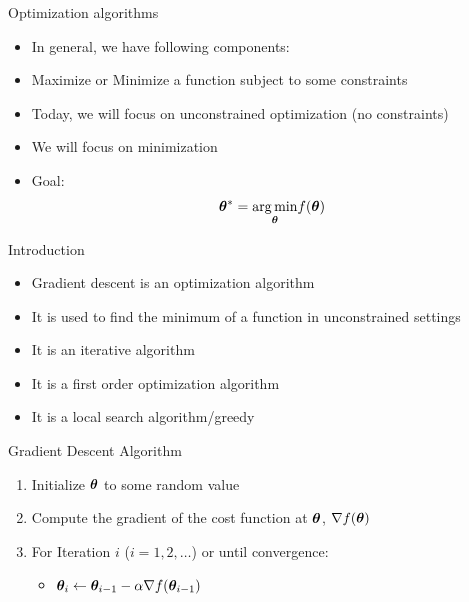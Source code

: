\documentclass[usenames,dvipsnames]{beamer}
\begin{document}
  \begin{frame}{Optimization algorithms}
    \begin{itemize}[<+->]
        \item In general, we have following components:
        \item Maximize or Minimize a function subject to some constraints
        \item Today, we will focus on unconstrained optimization (no constraints)
        \item We will focus on minimization
        \item Goal: 
        \begin{equation}
            \boldsymbol{\theta}^* = \underset{\boldsymbol{\theta}}{\operatorname*{arg\,min}}  f(\boldsymbol{\theta})
        \end{equation}
    \end{itemize}
    
  \end{frame}
  
\begin{frame}{Introduction}
    \begin{itemize}[<+->]
    \item Gradient descent is an optimization algorithm
    \item It is used to find the minimum of a function in unconstrained settings
    \item It is an iterative algorithm
    \item It is a first order optimization algorithm
    \item It is a local search algorithm/greedy
    \end{itemize}
\end{frame}



\begin{frame}{Gradient Descent Algorithm} 
    \begin{enumerate}[<+->]
        \item Initialize $\boldsymbol{\theta}$ to some random value
        \item Compute the gradient of the cost function at $\boldsymbol{\theta}$, $\nabla f(\boldsymbol{\theta})$
        \item For Iteration $i$ ($i = 1,2,\ldots$) or until convergence:
        \begin{itemize}
            \item $\boldsymbol{\theta}_{i} \gets   \boldsymbol{\theta}_{i-1} - \alpha \nabla f(\boldsymbol{\theta}_{i-1})$
        \end{itemize}
    \end{enumerate}
    
\end{frame}
    
\end{document}
